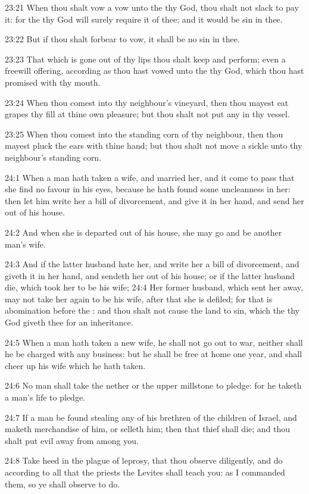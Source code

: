 23:21 When thou shalt vow a vow unto the \LORD thy God, thou shalt not slack to pay it: for the \LORD thy God will surely require it of thee; and it would be sin in thee.

23:22 But if thou shalt forbear to vow, it shall be no sin in thee.

23:23 That which is gone out of thy lips thou shalt keep and perform; even a freewill offering, according as thou hast vowed unto the \LORD thy God, which thou hast promised with thy mouth.

23:24 When thou comest into thy neighbour's vineyard, then thou mayest eat grapes thy fill at thine own pleasure; but thou shalt not put any in thy vessel.

23:25 When thou comest into the standing corn of thy neighbour, then thou mayest pluck the ears with thine hand; but thou shalt not move a sickle unto thy neighbour's standing corn.

24:1 When a man hath taken a wife, and married her, and it come to pass that she find no favour in his eyes, because he hath found some uncleanness in her: then let him write her a bill of divorcement, and give it in her hand, and send her out of his house.

24:2 And when she is departed out of his house, she may go and be another man's wife.

24:3 And if the latter husband hate her, and write her a bill of divorcement, and giveth it in her hand, and sendeth her out of his house; or if the latter husband die, which took her to be his wife; 24:4 Her former husband, which sent her away, may not take her again to be his wife, after that she is defiled; for that is abomination before the \LORD: and thou shalt not cause the land to sin, which the \LORD thy God giveth thee for an inheritance.

24:5 When a man hath taken a new wife, he shall not go out to war, neither shall he be charged with any business: but he shall be free at home one year, and shall cheer up his wife which he hath taken.

24:6 No man shall take the nether or the upper millstone to pledge: for he taketh a man's life to pledge.

24:7 If a man be found stealing any of his brethren of the children of Israel, and maketh merchandise of him, or selleth him; then that thief shall die; and thou shalt put evil away from among you.

24:8 Take heed in the plague of leprosy, that thou observe diligently, and do according to all that the priests the Levites shall teach you: as I commanded them, so ye shall observe to do.

